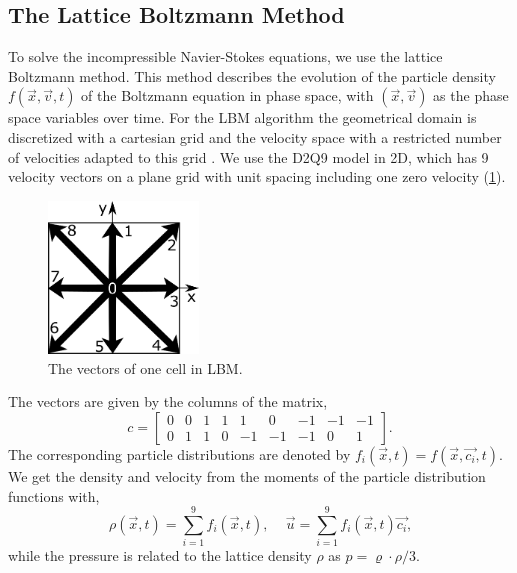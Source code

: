 \documentclass[final,leqno,onefignum,onetabnum]{siamltexmm}
\begin{document}
\subsection{The Lattice Boltzmann Method}
To solve the incompressible Navier-Stokes equations, we use the lattice Boltzmann method. This method describes the evolution of the particle density $f(\vec{x},\vec{v},t)$ of the Boltzmann equation in phase space, with $(\vec{x},\vec{v})$ as the phase space variables over time. For the LBM algorithm the geometrical domain is discretized with a cartesian grid and the velocity space with a restricted number of velocities adapted to this grid \cite{LBM1,LBM2,LBM3,LBM4}. We use the D2Q9 model in 2D, which has 9 velocity vectors on a plane grid with unit spacing including one zero velocity (\cref{lbmc_i}). 

\begin{figure}[h]
	\hfill\includegraphics[trim = 0mm 0cm 0mm 35mm, clip, width=4cm,natwidth=403,natheight=409]{LBMc_i.png}\hspace*{\fill}
	\caption{The vectors of one cell in LBM.}
	\label{lbmc_i}
\end{figure}
The vectors are given by the columns of the matrix,
\begin{equation}
	c = 
	\begin{bmatrix}
	0 & 0 & 1 & 1 &  1 &  0 & -1 & -1 & -1 \\
	0 & 1 & 1 & 0 & -1 & -1 & -1 &  0 &  1
	\end{bmatrix}
	\text{.}
  \label{disc_vel}
\end{equation}
The corresponding particle distributions are denoted by $f_i(\vec{x},t) = f(\vec{x},\vec{c_i},t)$. We get the density and velocity from the moments of the particle distribution functions with,
\begin{equation}
	\rho(\vec{x},t) = \sum_{i=1}^{9} f_i(\vec{x},t) \text{, } \quad
	\vec{u} = \sum_{i=1}^{9} f_i(\vec{x},t)\vec{c_i} \text{,}
\end{equation} 
while the pressure is related to the lattice density $\rho$ as $p=\varrho \cdot \rho/3$.
\end{document}
